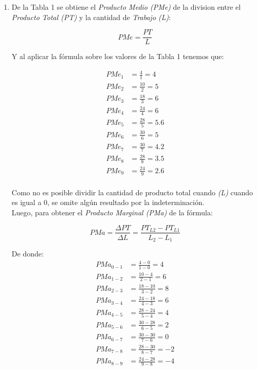 \documentclass[a4paper,12pt]{article}
\begin{document}
\begin{enumerate}

\item
De la Tabla 1 se obtiene el \emph{Producto Medio (PMe)} de la division entre el \emph{Producto Total (PT)} y la cantidad de \emph{Trabajo (L)}:

\[
	PMe = \frac{PT}{L}
\]

Y al aplicar la fórmula sobre los valores de la Tabla 1 tenemos que:

\begin{align*}
	PMe_1 &= \frac{4}{1} = 4 \\
	PMe_2 &= \frac{10}{2} = 5 \\
	PMe_3 &= \frac{18}{3} = 6 \\
	PMe_4 &= \frac{24}{4} = 6 \\
	PMe_5 &= \frac{28}{5} = 5.6 \\
	PMe_6 &= \frac{30}{6} = 5 \\
	PMe_7 &= \frac{30}{7} = 4.2 \\
	PMe_8 &= \frac{28}{8} = 3.5 \\
	PMe_9 &= \frac{24}{9} = 2.6 \\
\end{align*}

Como no es posible dividir la cantidad de producto total cuando \emph{(L)} cuando es igual a 0, se omite algún resultado por la indeterminación. \\
Luego, para obtener el \emph{Producto Marginal (PMa)} de la fórmula: 

\[
	PMa = \frac{\Delta PT}{\Delta L} = \frac{PT_{L2} - PT_{L1}}{L_2-L_1}
\]

De donde: \\

\begin{align*}
	PMa_{0-1} &= \frac{4 - 0}{1 - 0} = 4 \\
	PMa_{1-2} &= \frac{10 - 4}{2 - 1} = 6 \\
	PMa_{2-3} &= \frac{18 - 10}{3 - 2} = 8 \\
	PMa_{3-4} &= \frac{24 - 18}{4 - 3} = 6 \\
	PMa_{4-5} &= \frac{28 - 24}{5 - 4} = 4 \\
	PMa_{5-6} &= \frac{30 - 28}{6 - 5} = 2 \\
	PMa_{6-7} &= \frac{30 - 30}{7 - 6} = 0 \\
	PMa_{7-8} &= \frac{28 - 30}{8 - 7} = -2 \\
	PMa_{8-9} &= \frac{24 - 28}{9 - 8} = -4 \\
\end{align*}



\end{enumerate}
\end{document}
